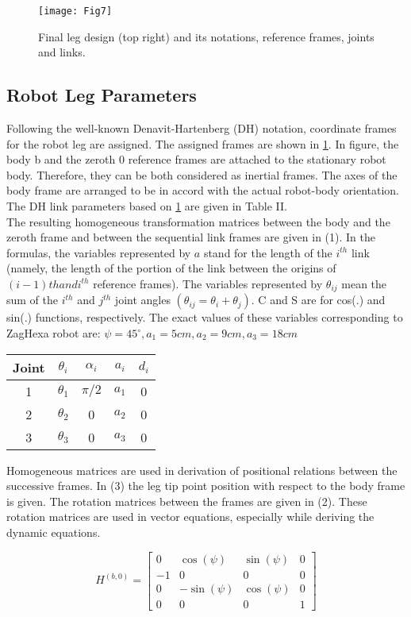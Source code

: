 \begin{figure}[h]
	\centering
	\texttt{[image: Fig7]}
	\caption{  Final leg design (top right) and its notations, reference frames, joints and links.}
	\label{leg}
\end{figure}

\subsection{Robot Leg Parameters}
Following the well-known Denavit-Hartenberg (DH) notation, coordinate frames for the robot leg are assigned. The assigned frames are shown in \ref{leg}. In figure, the body {b} and the zeroth {0} reference frames are attached to the stationary robot body. Therefore, they can be both considered as inertial frames. The axes of the body frame are arranged to be in accord with the actual robot-body orientation. The DH link parameters based on \ref{leg} are given in Table II.\\

The resulting homogeneous transformation matrices between the body and the zeroth frame and between the sequential link frames are given in (1).  In the formulas, the variables represented by $a$ stand for the length of the $i^{th}$ link (namely, the length of the portion of the link between the origins of $(i-1) th and i^{th}$ reference frames). The variables represented by $\theta_{ij}$ mean the sum of the $i^{th}$ and $j^{th}$ joint angles $(\theta_{ij}=\theta_i+\theta_j)$. C and S are for cos(.) and sin(.) functions, respectively.  The exact values of these variables corresponding to ZagHexa robot are: 
$\psi = 45^\circ, a_1= 5cm, a_2= 9cm, a_3= 18cm$
\begin{center}
\begin{tabular}{|c||c|c|c|c|}
	\hline
	Joint & $\theta_i$ & $\alpha_i$ & $a_i$ & $d_i$ \\ \hline
	1&		$\theta_1$ & $\pi/2$	& $a_1$ & 0 \\ \hline
	2&		$\theta_2$ & 0			& $a_2$ & 0 \\ \hline
	3&		$\theta_3$ & 0			& $a_3$ & 0 \\ \hline
\end{tabular}
\end{center}

Homogeneous matrices are used in derivation of positional relations between the successive frames.  In (3) the leg tip point position with respect to the body frame is given. The rotation matrices between the frames are given in (2). These rotation matrices are used in vector equations, especially while deriving the dynamic equations.
\begin{center}

\[
H^{(b,0)}=
\begin{bmatrix}
0 & \cos(\psi) & \sin(\psi) & 0 \\
-1&		0	   & 		0 	& 0\\
0 & -\sin(\psi)& \cos(\psi) & 0 \\
0 &		0	   & 		0 	& 1
\end{bmatrix}
\]
\end{center}

